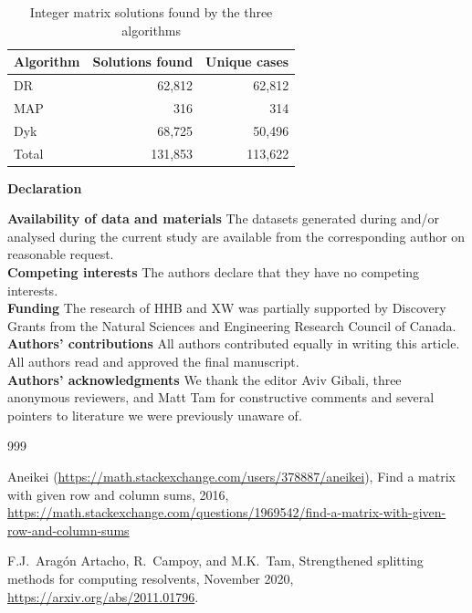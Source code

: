 \documentclass[12pt]{article}
\newcommand{\sepp}{\setlength{\itemsep}{-2pt}}
\theoremstyle{definition}
\begin{document}
{\begin{table}[H]
\label{table:Int}
\end{table}


\begin{table}[H]
\centering\renewcommand{\arraystretch}{1.4}
\begin{tabular}{l|r|r}
 \toprule
Algorithm    & Solutions found & Unique cases \\
\midrule %
\rowcolor{rowalt} 
DR   & 62,812     & 62,812                \\
MAP &  316   & 314                \\
\rowcolor{rowalt} 
Dyk   & 68,725    & 50,496                \\
\midrule
Total   & 131,853       & 113,622\\
\bottomrule
\end{tabular}
\caption{Integer matrix solutions found by the three algorithms}
\label{table:Intunique}
\end{table}

\small
\noindent
{\bf Declaration}

\footnotesize
\noindent
{\bf Availability of data and materials}
The datasets generated during and/or analysed during the current study are available from the corresponding author on reasonable request.\\
{\bf Competing interests}
The authors declare that they have no competing interests.\\
{\bf Funding}
The research of HHB and XW was partially supported 
by Discovery Grants from the Natural Sciences and Engineering Research Council of Canada.\\
{\bf Authors' contributions}
All authors contributed equally in writing this article. 
All authors read and approved the final manuscript.\\
{\bf Authors' acknowledgments}
{  
We thank the editor Aviv Gibali, three anonymous reviewers, and Matt Tam for 
constructive comments and several pointers to literature we were 
previously unaware of.
}

\small 

\begin{thebibliography}{999}
\sepp

Aneikei (\url{https://math.stackexchange.com/users/378887/aneikei}), 
Find a matrix with given row and column sums, 2016, 
\url{https://math.stackexchange.com/questions/1969542/find-a-matrix-with-given-row-and-column-sums}


F.J.\ Arag\'on Artacho, R.\ Campoy, and M.K.\ Tam,
Strengthened splitting methods for computing resolvents, 
November 2020, \url{https://arxiv.org/abs/2011.01796}. 


\end{thebibliography}}
\end{document}
